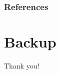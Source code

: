 \documentclass[usenames,dvipsnames]{beamer}
\theoremstyle{definition}
\begin{document}

\begin{frame}[allowframebreaks]
    \frametitle{References}
    

    
\end{frame}

\section{Backup}
\begin{frame}{}
\begin{center}
    \Large{Thank you!}
\end{center}
        
\end{frame}


\end{document}
